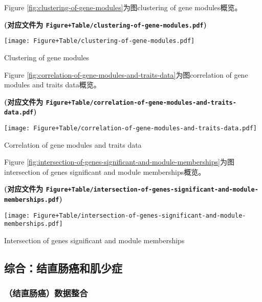 \documentclass[
]{article}
\begin{document}
Figure \ref{fig:clustering-of-gene-modules}为图clustering of gene modules概览。

\textbf{(对应文件为 \texttt{Figure+Table/clustering-of-gene-modules.pdf})}

\def\@captype{figure}
\begin{center}
\texttt{[image: Figure+Table/clustering-of-gene-modules.pdf]}
\caption{Clustering of gene modules}\label{fig:clustering-of-gene-modules}
\end{center}

Figure \ref{fig:correlation-of-gene-modules-and-traits-data}为图correlation of gene modules and traits data概览。

\textbf{(对应文件为 \texttt{Figure+Table/correlation-of-gene-modules-and-traits-data.pdf})}

\def\@captype{figure}
\begin{center}
\texttt{[image: Figure+Table/correlation-of-gene-modules-and-traits-data.pdf]}
\caption{Correlation of gene modules and traits data}\label{fig:correlation-of-gene-modules-and-traits-data}
\end{center}

Figure \ref{fig:intersection-of-genes-significant-and-module-memberships}为图intersection of genes significant and module memberships概览。

\textbf{(对应文件为 \texttt{Figure+Table/intersection-of-genes-significant-and-module-memberships.pdf})}

\def\@captype{figure}
\begin{center}
\texttt{[image: Figure+Table/intersection-of-genes-significant-and-module-memberships.pdf]}
\caption{Intersection of genes significant and module memberships}\label{fig:intersection-of-genes-significant-and-module-memberships}
\end{center}

\hypertarget{ux7efcux5408ux7ed3ux76f4ux80a0ux764cux548cux808cux5c11ux75c7}{%
\subsection{综合：结直肠癌和肌少症}\label{ux7efcux5408ux7ed3ux76f4ux80a0ux764cux548cux808cux5c11ux75c7}}

\hypertarget{ux7ed3ux76f4ux80a0ux764cux6570ux636eux6574ux5408}{%
\subsubsection{（结直肠癌）数据整合}\label{ux7ed3ux76f4ux80a0ux764cux6570ux636eux6574ux5408}}
\end{document}
